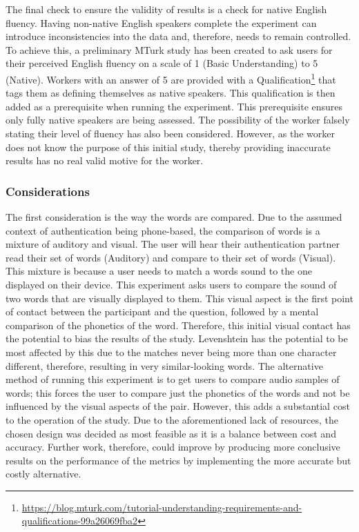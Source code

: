 The final check to ensure the validity of results is a check for native English fluency. Having non-native English speakers complete the 
experiment can introduce inconsistencies into the 
data and, therefore, needs to remain controlled. To achieve this, a preliminary MTurk study has been created to ask users for their perceived 
English fluency on a scale of 1 (Basic Understanding) to 5 (Native). 
Workers with an answer of 5 are provided with a 
Qualification\footnote{\url{https://blog.mturk.com/tutorial-understanding-requirements-and-qualifications-99a26069fba2}} 
that tags them as defining themselves as native speakers. This qualification is then 
added as a prerequisite when running the experiment. This prerequisite ensures 
only fully native speakers are being assessed. The possibility of the 
worker falsely stating their level of fluency has also been considered. 
However, as the worker does not know the purpose of this initial study,
thereby providing inaccurate results has no real valid motive for the 
worker.

\subsubsection{Considerations}
\label{sec:exp1_considerations}

The first consideration is the way the words are compared. Due to the assumed context of authentication being phone-based, the comparison of words is a mixture of auditory and visual. The user will hear their authentication partner read their set of words (Auditory) and compare to their set of words (Visual). This mixture is because a user needs to match a words sound to the one displayed on their device. This experiment asks users to compare the sound of two words that are visually displayed to them. This visual aspect is the first point of contact between the participant and the question, followed by a mental comparison of the phonetics of the word. Therefore, this initial visual contact has the potential to bias the results of the study. Levenshtein has the potential to be most affected by this due to the matches never being more than one character different, therefore, resulting in very similar-looking words. The alternative method of running this experiment is to get users to compare audio samples of words; this forces the user to compare just the phonetics of the words and not be influenced by the visual aspects of the pair. However, this adds a substantial cost to the operation of the study. Due to the aforementioned lack of resources, the chosen design was decided as most feasible as it is a balance between cost and accuracy. Further work, therefore, could improve by producing more conclusive results on the performance of the metrics by implementing the more accurate but costly alternative.

